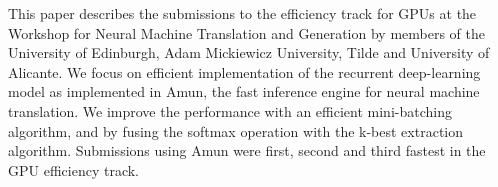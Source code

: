 This paper describes the submissions to the efficiency track for GPUs at the Workshop for Neural Machine Translation and Generation by members of the University of Edinburgh, Adam Mickiewicz University, Tilde and University of Alicante. We focus on efficient implementation of the recurrent deep-learning model as implemented in Amun, the fast inference engine for neural machine translation. We improve the performance with an efficient mini-batching algorithm, and by fusing the softmax operation with the k-best extraction algorithm. Submissions using Amun were first, second and third fastest in the GPU efficiency track.
